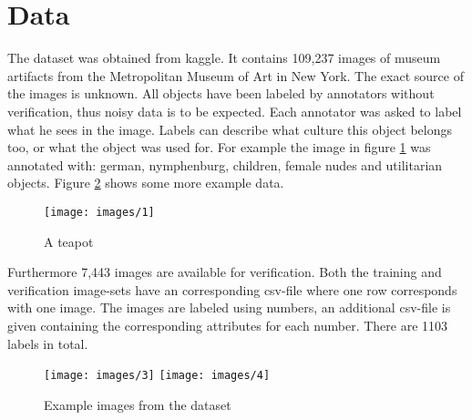 
\section{Data}
The dataset was obtained from kaggle\cite{imet}.
It contains 109,237 images of museum artifacts from the Metropolitan Museum of Art in New York.
The exact source of the images is unknown.
All objects have been labeled by  annotators without verification, thus noisy data is to be expected.
Each annotator was asked to label what he sees in the image.
Labels can describe what culture this object belongs too, or what the object was used for.
For example the image in figure \ref{fig:1} was annotated with: german, nymphenburg, children, female nudes and utilitarian objects.
Figure \ref{fig:2} shows some more example data.
\begin{figure}[h]
    \texttt{[image: images/1]}
    \caption{A teapot}
    \label{fig:1}
\end{figure}
Furthermore 7,443 images are available for verification.
Both the training and verification image-sets have an corresponding csv-file where one row corresponds with one image.
The images are labeled using numbers, an additional csv-file is given containing the corresponding attributes for each number.
There are 1103 labels in total.
\begin{figure}[h]
    \texttt{[image: images/3]}
    \texttt{[image: images/4]}
    \caption{Example images from the dataset}
    \label{fig:2}
\end{figure}
